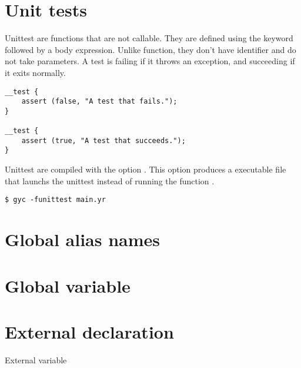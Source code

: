 

\section{Unit tests}%
\label{sec:unit_test}

Unittest are functions that are not callable. They are defined using the keyword
 followed by a body expression. Unlike function, they don't
have identifier and do not take parameters. A test is failing if it throws an
exception, and succeeding if it exits normally.

\begin{lstlisting}[style=coloredverbatim]
__test {
    assert (false, "A test that fails.");
}

__test {
    assert (true, "A test that succeeds.");
}
\end{lstlisting}


Unittest are compiled with the option . This option produces
a executable file that launchs the unittest instead of running the function
.

\begin{lstlisting}[style=intermediateVerb]
$ gyc -funittest main.yr
\end{lstlisting}

\section{Global alias names}
\label{sec:global_alias_names}


\section{Global variable}%
\label{sec:global_variables}

\section{External declaration}%
\label{sec:extern_var}

External variable
